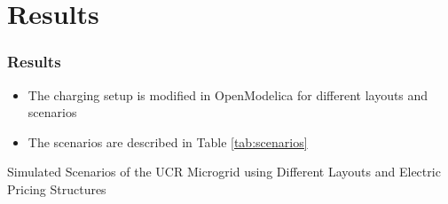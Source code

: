 \documentclass[aspectratio=169, 8 pt]{beamer}
\begin{document}
\section{Results}	
		\begin{frame}
			\frametitle{Results}
			\begin{itemize}
				\item The charging setup is modified in OpenModelica for different layouts and scenarios
				\item The scenarios are described in Table \ref{tab:scenarios}
			\end{itemize}
			
			\begin{table}
				\caption{Simulated Scenarios of the UCR Microgrid using Different Layouts and Electric Pricing Structures}
				\large
				
				\label{tab:scenarios}
			\end{table}
		\end{frame}
	
\end{document}
